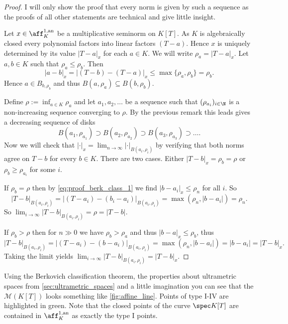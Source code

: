 \begin{proof}
	I will only show the proof that every norm is given by such a sequence as the proofs of all other statements are technical and give little insight. 

	Let $x \in \aff_K^{1, \text{an}}$ be a multiplicative seminorm on $K[T]$. 
	As  $K$ is algebraically closed every polynomial factors into linear factors $(T-a)$. 
	Hence $x$ is uniquely determined by its value $|T-a|_x$ for each $a \in K$. 
	We will write $\rho_a = |T-a|_x$.
	Let  $a, b \in K$ such that $\rho_a \le \rho_b$. 
	Then  \begin{equation}\label{eq:proof_berk_class_1}
		|a - b|_x = |(T-b) - (T - a)|_x \le \max \{\rho_a, \rho_b\} = \rho_b 
	.\end{equation} 
	Hence $a \in B_{b, \rho_b}$ and thus  $B(a, \rho_a) \subseteq B(b, \rho_b)$. 

	Define $\rho := \inf_{a \in K} \rho_a$ and let $a_1, a_2, \ldots$ be a sequence such that $(\rho_{a_i})_{i \in \N}  $ is a non-increasing sequence converging to $\rho$. 
	By the previous remark this leads gives a decreasing sequence of disks \[
		B(a_1, \rho_{a_1}) \supset B(a_2, \rho_{a_2}) \supset B(a_3, \rho_{a_3}) \supset\ldots
	.\] 
	Now we will check that $|\cdot |_x = \lim_{n \to \infty} |\cdot |_{B(a_i, \rho_i)}$ by verifying that both norms agree on $T- b$ for every $b \in K$. 
	 There are two cases. Either $|T - b|_x = \rho_b = \rho$ or $\rho_b \ge \rho_{a_i}$ for some $i$. 

	 If $ \rho_b = \rho$ then by \eqref{eq:proof_berk_class_1} we find $|b - a_i|_x \le \rho_n$ for all $i$.
	 So \[
		 |T - b|_{B(a_i, \rho_i)} = |(T - a_i) - (b_i - a_i)|_{B(a_i, \rho_i)} = \max(\rho_n, |b - a_i|) = \rho_n
	 .\]
	 So $\lim_{i \to \infty} |T- b|_{B(a_i, \rho_i)} = \rho = |T - b|$. 

	 If $\rho_b > \rho$ then for $n \gg 0$ we have $\rho_b > \rho_a$ and thus $|b - a|_x \le \rho_b$, thus \[
		 |T - b|_{B(a_i, \rho_i)} = |(T - a_i) - (b -a_i)|_{B(a_i, \rho_i)} = \max (\rho_n, |b - a_i|) = |b - a_i| = |T - b|_x
	 .\]   
	 Taking the limit yields $\lim_{i \to \infty} |T- b| _{B(a_i, \rho_{i})} = |T - b|_x$.
\end{proof}

Using the Berkovich classification theorem, the properties about ultrametric spaces from \cref{sec:ultrametric_spaces} and a little imagination you can see that the $\mathcal{M} (K[T])$ looks something like \cref{fig:affine_line}. 
Points of type I-IV are highlighted in green. Note that the closed points of the curve $\spec K[T]$ are contained in  $\aff_K^{1,\text{an}}$ as exactly the type I points. 

